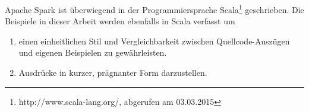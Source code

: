 Apache Spark ist überwiegend in der Programmiersprache Scala\footnote{http://www.scala-lang.org/, abgerufen am 03.03.2015} geschrieben. Die Beispiele in dieser Arbeit werden ebenfalls in Scala verfasst um
\begin{enumerate}
	\item einen einheitlichen Stil und Vergleichbarkeit zwischen Quellcode-Auszügen und eigenen Beispielen zu gewährleisten.
	\item Ausdrücke in kurzer, prägnanter Form darzustellen.
\end{enumerate}
